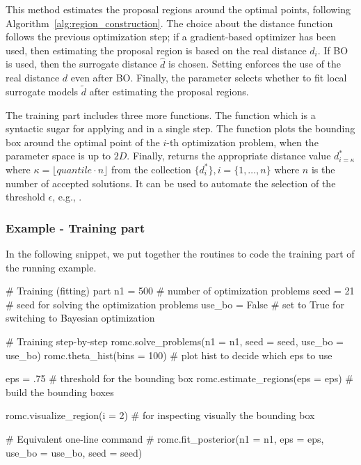 \documentclass[article, shortnames]{jss}
\begin{document}
\noindent
This method estimates the proposal regions around the optimal points,
following Algorithm~\ref{alg:region_construction}. The choice about
the distance function follows the previous optimization step; if a
gradient-based optimizer has been used, then estimating the proposal
region is based on the real distance \(d_i\). If BO is used, then the
surrogate distance \(\hat{d}\) is chosen. Setting
 enforces the use of the real distance \(d\)
even after BO. Finally, the parameter  selects
whether to fit local surrogate models \(\tilde{d}\) after estimating
the proposal regions.

\noindent
The training part includes three more functions. The function
 which is a syntactic sugar for
applying  and  in a
single step. The function  plots the
bounding box around the optimal point of the \(i\)-th optimization
problem, when the parameter space is up to \(2D\). Finally,
 returns the appropriate distance
value \(d_{i=\kappa}^*\) where
\(\kappa = \lfloor quantile \cdot n \rfloor\) from the collection
\(\{ d_i^* \}, i = \{1, \ldots, n\}\) where \(n\) is the number
of accepted solutions. It can be used to automate the selection of the
threshold \(\epsilon\), e.g.,
.


\subsubsection*{Example - Training part}


In the following snippet, we put together the routines to code the
training part of the running example.

\begin{Code}
# Training (fitting) part
n1 = 500 # number of optimization problems
seed = 21 # seed for solving the optimization problems
use_bo = False # set to True for switching to Bayesian optimization

# Training step-by-step
romc.solve_problems(n1 = n1, seed = seed, use_bo = use_bo)
romc.theta_hist(bins = 100) # plot hist to decide which eps to use

eps = .75 # threshold for the bounding box
romc.estimate_regions(eps = eps) # build the bounding boxes

romc.visualize_region(i = 2) # for inspecting visually the bounding box

# Equivalent one-line command
# romc.fit_posterior(n1 = n1, eps = eps, use_bo = use_bo, seed = seed)
\end{Code}
\end{document}
